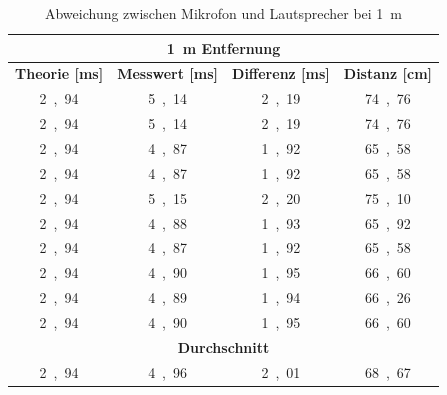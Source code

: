 \begin{table}[H]
\centering
\caption{Abweichung zwischen Mikrofon und Lautsprecher bei \SI{1}{m}}
\label{tab:modul_D_1}
\begin{tabular}{|c|c|c|c|}
\hline
\multicolumn{4}{|c|}{\textbf{\SI{1}{\m} Entfernung}} \\ \hline
\textbf{Theorie [\si{ms}]} & \textbf{Messwert [\si{ms}]} & \multicolumn{1}{l|}{\textbf{Differenz [\si{ms}]}} & \multicolumn{1}{l|}{\textbf{Distanz [\si{cm}]}} \\ \hline
\si{2,94} & \si{5,14} & \si{2,19} & \si{74,76} \\ \hline
\si{2,94} & \si{5,14} & \si{2,19} & \si{74,76} \\ \hline
\si{2,94} & \si{4,87} & \si{1,92} & \si{65,58} \\ \hline
\si{2,94} & \si{4,87} & \si{1,92} & \si{65,58} \\ \hline
\si{2,94} & \si{5,15} & \si{2,20} & \si{75,10} \\ \hline
\si{2,94} & \si{4,88} & \si{1,93} & \si{65,92} \\ \hline
\si{2,94} & \si{4,87} & \si{1,92} & \si{65,58} \\ \hline
\si{2,94} & \si{4,90} & \si{1,95} & \si{66,60} \\ \hline
\si{2,94} & \si{4,89} & \si{1,94} & \si{66,26} \\ \hline
\si{2,94} & \si{4,90} & \si{1,95} & \si{66,60} \\ \hline
\multicolumn{4}{|c|}{\textbf{Durchschnitt}} \\ \hline
\si{2,94} & \si{4,96} & \si{2,01} & \si{68,67} \\ \hline
\end{tabular}
\end{table}

